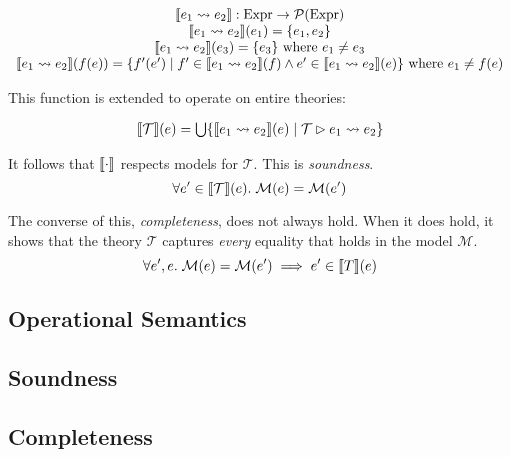 \documentclass[runningheads]{llncs}
\begin{document}
\[
  \begin{array}{c}
    \llbracket e_1 \leadsto e_2 \rrbracket : \textnormal{Expr} \rightarrow \mathcal{P}(\textnormal{Expr})
    \\
    \llbracket e_1 \leadsto e_2 \rrbracket(e_1) = \{e_1, e_2\}
    \\
    \llbracket e_1 \leadsto e_2 \rrbracket(e_3) = \{e_3\}\textnormal{ where $e_1\neq e_3$}
    \\
    \llbracket e_1 \leadsto e_2 \rrbracket(f(e)) = \{ f'(e') \mid f' \in \llbracket e_1 \leadsto e_2 \rrbracket(f) \land e' \in \llbracket e_1 \leadsto e_2 \rrbracket(e) \}
        \textnormal{ where $e_1 \neq f(e)$}
  \end{array}
\]

\noindent
This function is extended to operate on entire theories:

\[
  \begin{array}{c}
    \llbracket \mathcal{T} \rrbracket(e) = \bigcup\{ \llbracket e_1 \leadsto e_2 \rrbracket(e) \mid \mathcal{T} \rhd e_1 \leadsto e_2 \}
  \end{array}
\]

\noindent
It follows that $\llbracket \cdot \rrbracket$ respects models for $\mathcal{T}$. This is \textit{soundness}.
\[
  \forall e' \in \llbracket \mathcal{T} \rrbracket(e).\; \mathcal{M}(e) = \mathcal{M}(e')
\]

\noindent
The converse of this, \textit{completeness}, does not always hold. When it does hold, it shows that the theory $\mathcal{T}$ captures \textit{every} equality that holds in the model $\mathcal{M}$.
\[
  \forall e', e.\; \mathcal{M}(e) = \mathcal{M}(e') \implies e' \in \llbracket T \rrbracket(e)
\]
%
%


\subsection{Operational Semantics}

\subsection{Soundness}

\subsection{Completeness}




\end{document}
